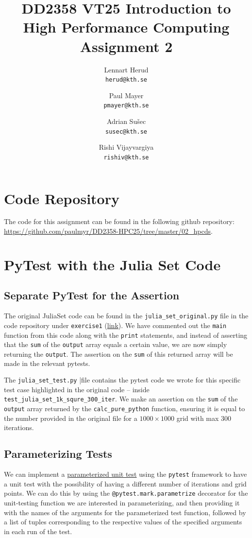 \documentclass[a4paper,12pt]{article}
\title{
  \normalsize{DD2358 VT25 Introduction to}\\
  \normalsize{High Performance Computing}\\
  \large{Assignment 2}\\
}
\author{
  \small Lennart Herud\\[-0.75ex]
  \scriptsize\texttt{herud@kth.se}
  \and
    \small Paul Mayer\\[-0.75ex]
  \scriptsize\texttt{pmayer@kth.se}
  \and
    \small Adrian Sušec\\[-0.75ex]
  \scriptsize\texttt{susec@kth.se}
  \and
  \small Rishi Vijayvargiya\\[-0.75ex]
  \scriptsize\texttt{rishiv@kth.se}
}
\date{}
\begin{document}
\maketitle
\thispagestyle{firstpagestyle}


\vspace{1em}

%
%

\section*{Code Repository}
The code for this assignment can be found in the following github repository:
\url{https://github.com/paulmyr/DD2358-HPC25/tree/master/02_hpcds}.

\section{PyTest with the Julia Set Code}
\subsection{Separate PyTest for the Assertion}
The original JuliaSet code can be found in the \verb|julia_set_original.py| file in the code repository under \verb|exercise1| (\href{https://github.com/paulmyr/DD2358-HPC25/tree/master/02_hpcds/exercise1/julia_set_original.py}{link}). We have commented out the \verb|main| function from this code along with the \verb|print| statements, and instead of asserting that the \verb|sum| of the \verb|output| array equals a certain value, we are now simply returning the \verb|output|. The assertion on the \verb|sum| of this returned array will be made in the relevant pytests. 

The \verb|julia_set_test.py| |file contains the pytest code we wrote for this specific test case highlighted in the original code -- inside \verb|test_julia_set_1k_squre_300_iter|. We make an assertion on the \verb|sum| of the \verb|output| array returned by the \verb|calc_pure_python| function, ensuring it is equal to the number provided in the original file for a $1000 \times 1000$ grid with max 300 iterations. 

\subsection{Parameterizing Tests}
We can implement a \underline{parameterized unit test} using the \verb|pytest| framework to have a unit test with the possibility of having a different number of iterations and grid points. We can do this by using the \verb|@pytest.mark.parametrize| decorator for the unit-testing function we are interested in parameterizing, and then providing it with the names of the arguments for the parameterized test function, followed by a list of tuples corresponding to the respective values of the specified arguments in each run of the test. 
\end{document}
